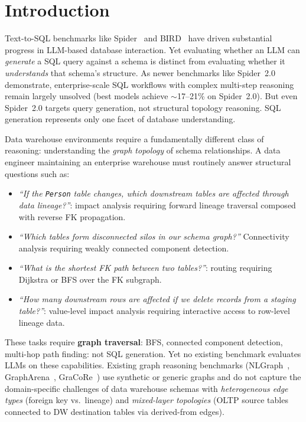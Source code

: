 \section{Introduction}
\label{sec:introduction}

Text-to-SQL benchmarks like Spider~\cite{yu2018spider} and BIRD~\cite{li2023bird}
have driven substantial progress in LLM-based database interaction.
Yet evaluating whether an LLM can \emph{generate} a SQL query against a schema
is distinct from evaluating whether it \emph{understands} that schema's structure.
As newer benchmarks like Spider~2.0~\cite{lei2024spider2} demonstrate,
enterprise-scale SQL workflows with complex multi-step reasoning remain
largely unsolved (best models achieve $\sim$17--21\% on Spider~2.0).
But even Spider~2.0 targets query generation, not structural topology reasoning.
SQL generation represents only one facet of database understanding.

Data warehouse environments require a fundamentally different class of
reasoning: understanding the \emph{graph topology} of schema relationships.
A data engineer maintaining an enterprise warehouse must routinely answer
structural questions such as:

\begin{itemize}
  \item \emph{``If the \texttt{Person} table changes, which downstream
    tables are affected through data lineage?''}: impact analysis
    requiring forward lineage traversal composed with reverse FK propagation.
  \item \emph{``Which tables form disconnected silos in our schema graph?''}
    Connectivity analysis requiring weakly connected component detection.
  \item \emph{``What is the shortest FK path between two tables?''}:
    routing requiring Dijkstra or BFS over the FK subgraph.
  \item \emph{``How many downstream rows are affected if we delete
    records from a staging table?''}: value-level impact analysis
    requiring interactive access to row-level lineage data.
\end{itemize}

These tasks require \textbf{graph traversal}: BFS, connected component
detection, multi-hop path finding: not SQL generation.  Yet no existing
benchmark evaluates LLMs on these capabilities.  Existing graph reasoning
benchmarks (NLGraph~\cite{wang2023nlgraph}, GraphArena~\cite{grapharena2024},
GraCoRe~\cite{gracore2024}) use synthetic or generic graphs and do not
capture the domain-specific challenges of data warehouse schemas with
\emph{heterogeneous edge types} (foreign key vs.\ lineage) and
\emph{mixed-layer topologies} (OLTP source tables connected to DW
destination tables via derived-from edges).

